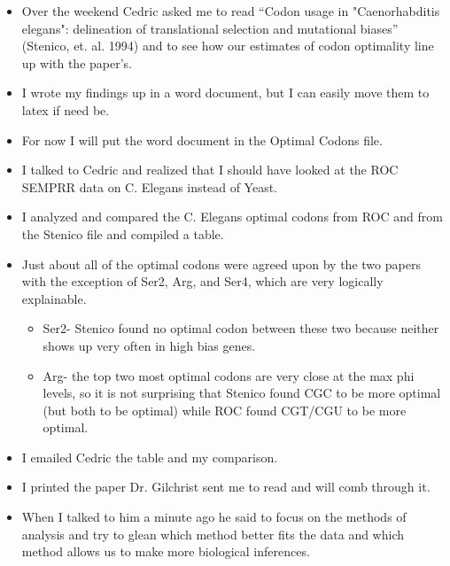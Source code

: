 \documentclass[letterpaper,index=totoc,hyperref,openany]{labbook} %
\begin{document}
\begin{itemize}
\item Over the weekend Cedric asked me to read \enquote{Codon usage in "Caenorhabditis elegans": delineation of translational selection and mutational biases} (Stenico, et. al. 1994) and to see how our estimates of codon optimality line up with the paper's. 
\item I wrote my findings up in a word document, but I can easily move them to latex if need be.
\item For now I will put the word document in the Optimal Codons file.
\item I talked to Cedric and realized that I should have looked at the ROC SEMPRR data on C. Elegans instead of Yeast.
\item I analyzed and compared the C. Elegans optimal codons from ROC and from the Stenico file and compiled a table.
\item Just about all of the optimal codons were agreed upon by the two papers with the exception of Ser2, Arg, and Ser4, which are very logically explainable.
\begin{itemize}
\item Ser2- Stenico found no optimal codon between these two because neither shows up very often in high bias genes.
\item Arg- the top two most optimal codons are very close at the max phi levels, so it is not surprising that Stenico found CGC to be more optimal (but both to be optimal) while ROC found CGT/CGU to be more optimal.
\end{itemize}
\item I emailed Cedric the table and my comparison.
\item I printed the paper Dr. Gilchrist sent me to read and will comb through it.
\item When I talked to him a minute ago he said to focus on the methods of analysis and try to glean which method better fits the data and which method allows us to make more biological inferences.
\end{itemize}
\end{document}
